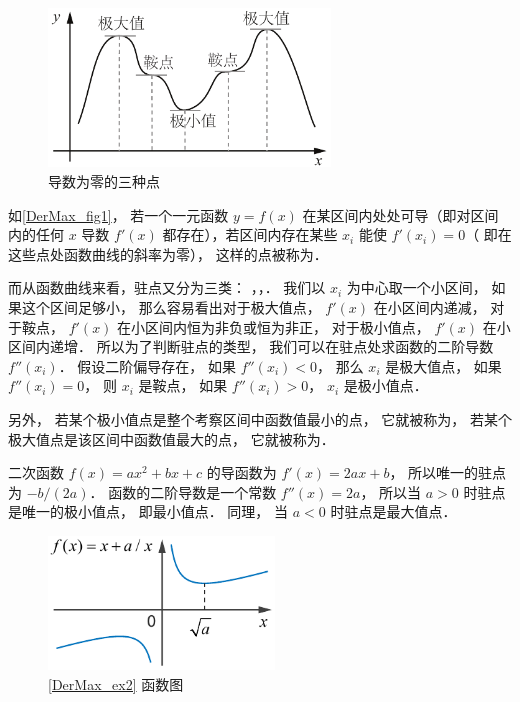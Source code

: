 
\begin{figure}[ht]
\vskip-10pt
\centering
\includegraphics[width=7.5cm]{./figures/DerMax1.pdf}
\caption{导数为零的三种点}\label{DerMax_fig1}
\end{figure}

如\autoref{DerMax_fig1}， 若一个一元函数 $y = f(x)$ 在某区间内处处可导（即对区间内的任何 $x$ 导数 $f'(x)$ 都存在），若区间内存在某些 $x_i$ 能使 $f'(x_i) = 0$（ 即在这些点处函数曲线的斜率为零）， 这样的点被称为．

而从函数曲线来看，驻点又分为三类： ，，． 我们以 $x_i$ 为中心取一个小区间， 如果这个区间足够小， 那么容易看出对于极大值点， $f'(x)$ 在小区间内递减， 对于鞍点， $f'(x)$ 在小区间内恒为非负或恒为非正， 对于极小值点， $f'(x)$ 在小区间内递增． 所以为了判断驻点的类型， 我们可以在驻点处求函数的二阶导数 $f''(x_i)$． 假设二阶偏导存在， 如果 $f''(x_i) < 0$， 那么 $x_i$ 是极大值点， 如果 $f''(x_i) = 0$， 则 $x_i$  是鞍点， 如果 $f''(x_i) > 0$， $x_i$ 是极小值点．

另外， 若某个极小值点是整个考察区间中函数值最小的点， 它就被称为， 若某个极大值点是该区间中函数值最大的点， 它就被称为．

\begin{exam}{}
二次函数 $f(x) = ax^2 + bx + c$ 的导函数为 $f'(x) = 2ax + b$， 所以唯一的驻点为 $-b/(2a)$． 函数的二阶导数是一个常数 $f''(x) = 2a$， 所以当 $a > 0$ 时驻点是唯一的极小值点， 即最小值点． 同理， 当 $a < 0$ 时驻点是最大值点．
\end{exam}

\begin{figure}[ht]
\centering
\includegraphics[width=6cm]{./figures/DerMax2.pdf}
\caption{\autoref{DerMax_ex2} 函数图} \label{DerMax_fig2}
\end{figure}

